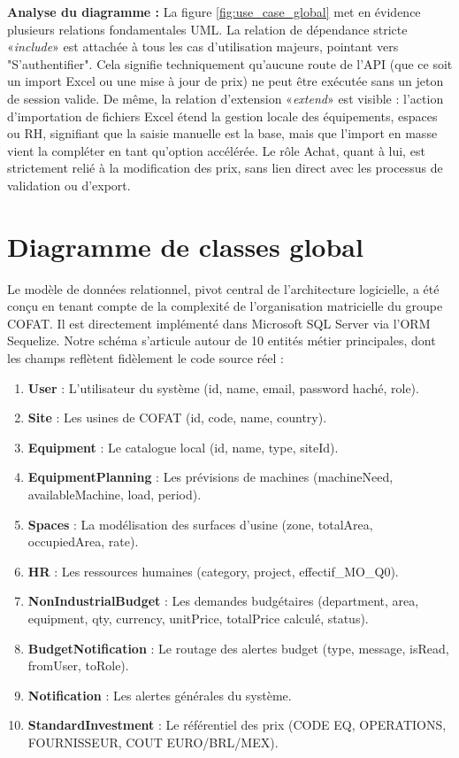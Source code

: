 \textbf{Analyse du diagramme :}
La figure \ref{fig:use_case_global} met en évidence plusieurs relations fondamentales UML. La relation de dépendance stricte «\textit{include}» est attachée à tous les cas d'utilisation majeurs, pointant vers "S'authentifier". Cela signifie techniquement qu'aucune route de l'API (que ce soit un import Excel ou une mise à jour de prix) ne peut être exécutée sans un jeton de session valide. De même, la relation d'extension «\textit{extend}» est visible : l'action d'importation de fichiers Excel étend la gestion locale des équipements, espaces ou RH, signifiant que la saisie manuelle est la base, mais que l'import en masse vient la compléter en tant qu'option accélérée. Le rôle Achat, quant à lui, est strictement relié à la modification des prix, sans lien direct avec les processus de validation ou d'export.

\section{Diagramme de classes global}
Le modèle de données relationnel, pivot central de l'architecture logicielle, a été conçu en tenant compte de la complexité de l'organisation matricielle du groupe COFAT. Il est directement implémenté dans Microsoft SQL Server via l'ORM Sequelize. Notre schéma s'articule autour de 10 entités métier principales, dont les champs reflètent fidèlement le code source réel :

\begin{enumerate}
    \item \textbf{User} : L'utilisateur du système (id, name, email, password haché, role).
    \item \textbf{Site} : Les usines de COFAT (id, code, name, country).
    \item \textbf{Equipment} : Le catalogue local (id, name, type, siteId).
    \item \textbf{EquipmentPlanning} : Les prévisions de machines (machineNeed, availableMachine, load, period).
    \item \textbf{Spaces} : La modélisation des surfaces d'usine (zone, totalArea, occupiedArea, rate).
    \item \textbf{HR} : Les ressources humaines (category, project, effectif_MO_Q0).
    \item \textbf{NonIndustrialBudget} : Les demandes budgétaires (department, area, equipment, qty, currency, unitPrice, totalPrice calculé, status).
    \item \textbf{BudgetNotification} : Le routage des alertes budget (type, message, isRead, fromUser, toRole).
    \item \textbf{Notification} : Les alertes générales du système.
    \item \textbf{StandardInvestment} : Le référentiel des prix (CODE EQ, OPERATIONS, FOURNISSEUR, COUT EURO/BRL/MEX).
\end{enumerate}

